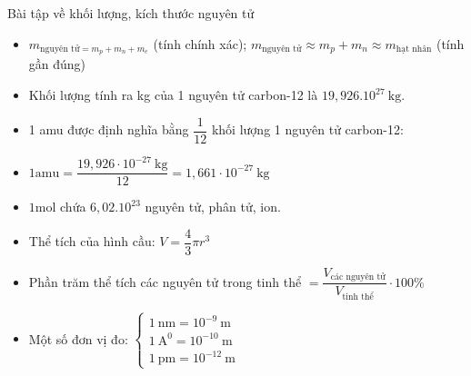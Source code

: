 
\newpage
\begin{dang}{Bài tập về khối lượng, kích thước nguyên tử}	
	\begin{itemize}
		\item $ m _{\text{nguyên tử}=m_{p}+m_{n} + m_{e} } $ (tính chính xác); $ m _{\text{nguyên tử}} \approx  m_{p} + m_{n} \approx m_{\text{hạt nhân}} $ (tính gần đúng)
		\item Khối lượng tính ra kg của 1 nguyên tử carbon-12 là $ 19,926 . 10^{27}~\mathrm{kg}$.
		\item 1 amu được định nghĩa bằng $\dfrac{1}{12}$ khối lượng 1 nguyên tử carbon-12:
		\item$1 \mathrm{amu}=\dfrac{19,926 \cdot 10^{-27} \mathrm{~kg}}{12}=1,661 \cdot 10^{-27} \mathrm{~kg}$
		\item$1 \mathrm{mol}$ chứa $ 6,02.10^{23} $ nguyên tử, phân tử, ion.
	\end{itemize}
	\begin{itemize}
		\item Thể tích của hình cầu:
		$ V=\dfrac{4}{3}\pi r^3 $
		\item Phần trăm thể tích các nguyên tử trong tinh thể $ = \dfrac{V_{\text{các nguyên tử}}}{V_{\text{tinh thể}}}\cdot 100\% $
		\item Một số đơn vị đo: 
		$\left\{\begin{array}{l}
			1~\mathrm{nm} = 10^{-9}~\mathrm{m}\\
			1~\mathrm{A^{0}} = 10^{-10}~\mathrm{m}\\
			1~\mathrm{pm} = 10^{-12}~\mathrm{m}	
		\end{array}\right.$
	\end{itemize}
\end{dang}

